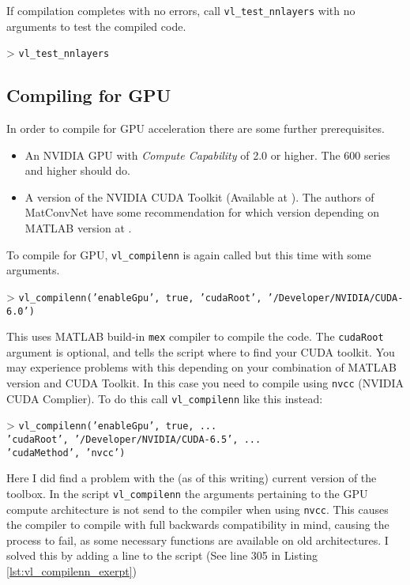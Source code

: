 \documentclass[Main]{subfiles}
\begin{document}
		If compilation completes with no errors, call \texttt{vl\_test\_nnlayers} with no arguments to test the compiled code.

		> \texttt{vl\_test\_nnlayers}\\


	\subsection{Compiling for GPU} %
		\label{sub:compiling_for_gpu}
		In order to compile for GPU acceleration there are some further prerequisites.
		\begin{itemize}
			\item
			An NVIDIA GPU with \emph{Compute Capability} of 2.0 or higher. The 600 series and higher should do.

			\item
			A version of the NVIDIA CUDA Toolkit (Available at \cite{Corporation2015}).
			The authors of MatConvNet have some recommendation for which version depending on MATLAB version at \cite{Lenc2014}.
		\end{itemize}

		\newpage
		To compile for GPU, \texttt{vl\_compilenn} is again called but this time with some arguments.

		> \texttt{vl\_compilenn('enableGpu', true, 'cudaRoot', '/Developer/NVIDIA/CUDA-6.0')}

		This uses MATLAB build-in \texttt{mex} compiler to compile the code. The \texttt{cudaRoot} argument is optional, and tells the script where to find your CUDA toolkit.
		You may experience problems with this depending on your combination of MATLAB version and CUDA Toolkit.
		In this case you need to compile using \texttt{nvcc} (NVIDIA CUDA Complier).
		To do this call \texttt{vl\_compilenn} like this instead:

		> \texttt{vl\_compilenn('enableGpu', true, ...\\
			\-\hspace{3.05cm}'cudaRoot', '/Developer/NVIDIA/CUDA-6.5', ...\\
			\-\hspace{3.05cm}'cudaMethod', 'nvcc')}

		Here I did find a problem with the (as of this writing) current version of the toolbox.
		In the script \texttt{vl\_compilenn} the arguments pertaining to the GPU compute architecture is not send to the compiler when using \texttt{nvcc}.
		This causes the compiler to compile with full backwards compatibility in mind, causing the process to fail, as some necessary functions are available on old architectures.
		I solved this by adding a line to the script (See line 305 in Listing \ref{lst:vl_compilenn_exerpt})
\end{document}
